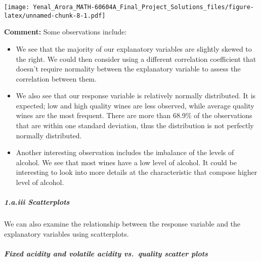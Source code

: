 \documentclass[
]{article}
\newenvironment{Shaded}{\begin{snugshade}}{\end{snugshade}}
\newcommand{\AttributeTok}[1]{\textcolor[rgb]{0.77,0.63,0.00}{#1}}
\newcommand{\FunctionTok}[1]{\textcolor[rgb]{0.00,0.00,0.00}{#1}}
\newcommand{\NormalTok}[1]{#1}
\newcommand{\SpecialCharTok}[1]{\textcolor[rgb]{0.00,0.00,0.00}{#1}}
\newcommand{\StringTok}[1]{\textcolor[rgb]{0.31,0.60,0.02}{#1}}
\begin{document}
\begin{Shaded}
\end{Shaded}

\texttt{[image: Yenal\_Arora\_MATH-60604A\_Final\_Project\_Solutions\_files/figure-latex/unnamed-chunk-8-1.pdf]}

\textbf{Comment:} Some observations include:

\begin{itemize}
\item
  We see that the majority of our explanatory variables are slightly
  skewed to the right. We could then consider using a different
  correlation coefficient that doesn't require normality between the
  explanatory variable to assess the correlation between them.
\item
  We also see that our response variable is relatively normally
  distributed. It is expected; low and high quality wines are less
  observed, while average quality wines are the most frequent. There are
  more than 68.9\% of the observations that are within one standard
  deviation, thus the distribution is not perfectly normally
  distributed.
\item
  Another interesting observation includes the imbalance of the levels
  of alcohol. We see that most wines have a low level of alcohol. It
  could be interesting to look into more details at the characteristic
  that compose higher level of alcohol.
\end{itemize}

\hypertarget{a.iii-scatterplots}{%
\subparagraph{1.a.iii Scatterplots}\label{a.iii-scatterplots}}

We can also examine the relationship between the response variable and
the explanatory variables using scatterplots.

\hypertarget{fixed-acidity-and-volatile-acidity-vs.-quality-scatter-plots}{%
\subparagraph{Fixed acidity and volatile acidity vs.~quality scatter
plots}\label{fixed-acidity-and-volatile-acidity-vs.-quality-scatter-plots}}
\end{document}
